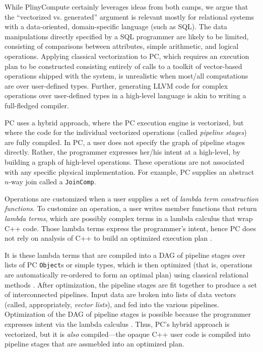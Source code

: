 While PlinyCompute certainly leverages ideas from both camps, we argue that the ``vectorized vs. generated'' argument is relevant mostly for 
relational systems with a data-oriented, domain-specific language (such as SQL).  
The data manipulations directly specified by a SQL programmer are likely to be limited, 
consisting of comparisons between attributes, simple arithmetic, and logical operations.
Applying classical vectorization to PC,
which requires an execution plan to be constructed consisting entirely of calls to a toolkit of
vector-based operations shipped with the system, is
unrealistic when most/all computations are over user-defined types.  
Further, generating LLVM code for complex operations over user-defined types 
in a high-level language 
is akin to writing a full-fledged compiler. 


PC uses a hybrid approach, where the PC execution engine is vectorized, but where the code for the individual vectorized operations (called \emph{pipeline stages})
are fully compiled.  
In PC, a user does not specify the graph of pipeline stages directly.  Rather,
the programmer expresses her/his intent at a high-level, by building a graph of high-level operations.  These operations 
are not associated with any specific 
physical implementation.
For example, PC supplies an abstract $n$-way join called a \texttt{JoinComp}.

Operations are customized when a user supplies a set of 
\emph{lambda term
construction functions}.  To customize an operation, a user writes member functions
that return \emph{lambda terms}, which are possibly complex terms in a lambda calculus that 
wrap C++ code.  Those lambda terms express the programmer's intent, hence PC does not rely on analysis of C++ to build an optimized
execution plan \cite{alexandrov2015implicit}. 

It is these lambda terms that are compiled into a DAG of pipeline stages over
lists of PC \texttt{Object}s or simple types,
which is then optimized (that is, operations are automatically
re-ordered to form an optimal plan) using classical relational
methods \cite{chaudhuri1998overview, graefe1995cascades, jarke1984query}. After optimization, the pipeline stages are fit together to produce a set of interconnected pipelines.  Input data are broken into lists of 
data vectors (called, appropriately, \emph{vector lists}), and fed into the various pipelines.
Optimization of the DAG of pipeline stages
is possible because the programmer expresses intent via the lambda calculus \cite{barendregt1984lambda, moggi1989computational}.
Thus, PC's hybrid approach is vectorized, 
but it is \emph{also} compiled---the opaque C++ user code is compiled into pipeline stages that are 
assmebled into an optimized plan.


